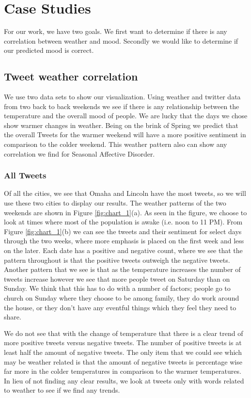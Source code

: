 \documentclass[journal]{vgtc}                %
\begin{document}
\section{Case Studies}
For our work, we have two goals. We first want to determine if there is any correlation between weather and mood. Secondly we would like to determine if our predicted mood is correct. 

\subsection{Tweet weather correlation}
We use two data sets to show our visualization. Using weather and twitter data from two back to back weekends we see if there is any relationship between the temperature and the overall mood of people. We are lucky that the days we chose show warmer changes in weather. Being on the brink of Spring we predict that the overall Tweets for the warmer weekend will have a more positive sentiment in comparison to the colder weekend. This weather pattern also can show any correlation we find for Seasonal Affective Disorder.

\subsubsection{All Tweets}
Of all the cities, we see that Omaha and Lincoln have the most tweets, so we will use these two cities to display our results. The weather patterns of the two weekends are shown in Figure \ref{fig:chart_1}(a). As seen in the figure, we choose to look at times where most of the population is awake (i.e. noon to 11 PM). From Figure \ref{fig:chart_1}(b) we can see the tweets and their sentiment for select days through the two weeks, where more emphasis is placed on the first week and less on the later. Each date has a positive and negative count, where we see that the pattern throughout is that the positive tweets outweigh the negative tweets. Another pattern that we see is that as the temperature increases the number of tweets increase however we see that more people tweet on Saturday than on Sunday. We think that this has to do with a number of factors; people go to church on Sunday where they choose to be among family, they do work around the house, or they don't have any eventful things which they feel they need to share. 

We do not see that with the change of temperature that there is a clear trend of more positive tweets versus negative tweets. The number of positive tweets is at least half the amount of negative tweets. The only item that we could see which may be weather related is that the amount of negative tweets is percentage wise far more in the colder temperatures in comparison to the warmer temperatures. In lieu of not finding any clear results, we look at tweets only with words related to weather to see if we find any trends.
\end{document}
